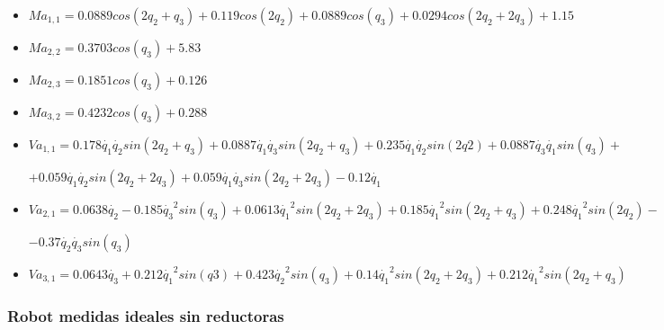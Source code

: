 \begin{itemize}
	
	\item $ Ma_{1,1}=0.0889cos(2q_{2} + q_{3}) + 0.119cos(2q_{2}) + 0.0889cos(q_{3}) + 0.0294cos(2q_{2} + 2q_{3}) + 1.15$ \\ \vspace{0.2cm}
	
	\item $ Ma_{2,2}=0.3703cos(q_{3}) + 5.83$ \\ \vspace{0.2cm}
	
	\item $ Ma_{2,3}=0.1851cos(q_{3}) + 0.126  $ \\ \vspace{0.2cm}
	
	\item $ Ma_{3,2}=0.4232cos(q_{3}) + 0.288  $ \\ \vspace{0.2cm}
	
	\item $ Va_{1,1}=0.178\dot{q_1}\dot{q_2}sin(2q_2 + q_3) + 0.0887\dot{q_1}\dot{q_3}sin(2q_2 + q_3) + 0.235\dot{q_1}\dot{q_2}sin(2q2) + 0.0887\dot{q_3}\dot{q_1}sin(q_3) + $ \\ \vspace{0.1cm}
	
	$+0.059\dot{q_1}\dot{q_2}sin(2q_2 + 2q_3) + 0.059\dot{q_1}\dot{q_3}sin(2q_2 + 2q_3) - 0.12\dot{q_1} $ \\ \vspace{0.2cm}
	
	\item $ Va_{2,1}=0.0638\dot{q_2} - 0.185\dot{q_3}^{2}sin(q_3) + 0.0613\dot{q_1}^{2}sin(2q_2 + 2q_3) + 0.185\dot{q_1}^{2}sin(2q_2 + q_3) + 0.248\dot{q_1}^{2}sin(2q_2) - $ \\ \vspace{0.1cm}
	
	$ -0.37\dot{q_2}\dot{q_3}sin(q_3) $\\ \vspace{0.2cm}
	
	\item $ Va_{3,1}= 0.0643\dot{q_3} + 0.212\dot{q_1}^{2}sin(q3) + 0.423\dot{q_2}^{2}sin(q_3) + 0.14\dot{q_1}^{2}sin(2q_2 + 2q_3) + 0.212\dot{q_1}^{2}sin(2q_2 + q_3) $
	
\end{itemize}


\subsubsection{Robot medidas ideales sin reductoras}

